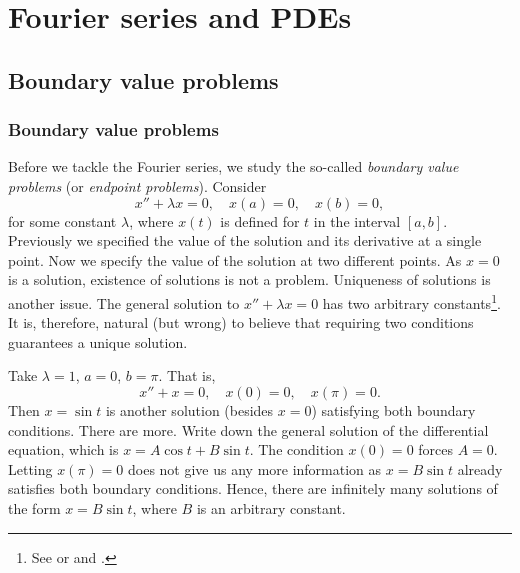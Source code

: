 \chapter{Fourier series and PDEs} \label{FS:chapter}


\section{Boundary value problems} \label{bvp:section}


\subsection{Boundary value problems}

Before we tackle the Fourier series, we study
the so-called 
\emph{boundary value problems}
(or \emph{endpoint problems}).  Consider
\begin{equation*}
x'' + \lambda x = 0, \quad x(a) = 0, \quad x(b) = 0,
\end{equation*}
for some constant $\lambda$, where $x(t)$ is defined for $t$ in the interval
$[a,b]$.
Previously we specified the value of the solution and its derivative
at a single point.  Now we specify the value of the solution at two different
points.  As $x=0$ is a solution, existence of
solutions is not a problem.  Uniqueness of solutions is another issue.
The general solution to $x'' + \lambda x = 0$ has two
arbitrary constants\footnote{%
See  or  and
.}.
It is, therefore,
natural (but wrong) to believe that requiring two
conditions guarantees a unique solution.

\begin{example}
Take $\lambda = 1$,
$a=0$, $b=\pi$.  That is,
\begin{equation*}
x'' + x = 0, \quad x(0) = 0, \quad x(\pi) = 0.
\end{equation*}
Then $x = \sin t$ is another solution (besides $x=0$) satisfying both boundary
conditions.  There are more.  Write down the general
solution of the differential equation, which is $x= A \cos t + B \sin t$.
The condition $x(0) = 0$ forces $A=0$.  Letting $x(\pi) = 0$ does not
give us any more information as $x = B \sin t$ already satisfies both
boundary conditions.
Hence, there are infinitely many solutions of the form $x = B \sin t$,
where $B$ is an arbitrary constant.
\end{example}

